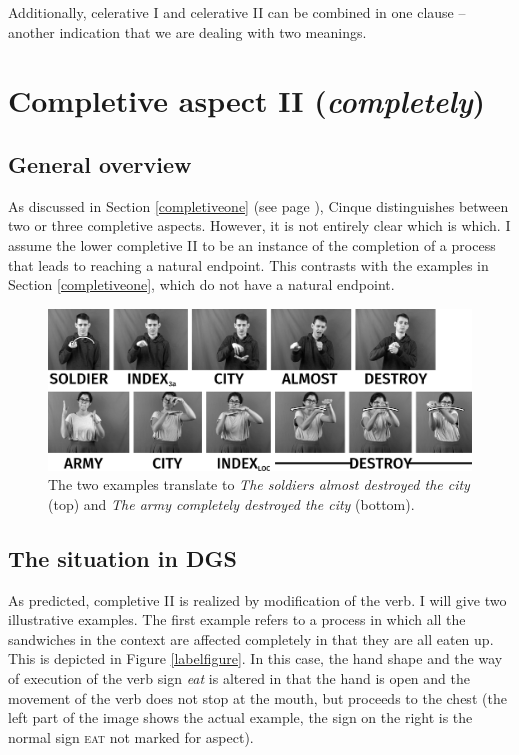 \noindent Additionally, celerative I and celerative II can be combined in one clause -- another indication that we are dealing with two meanings. 


\largerpage[-2]
\section{Completive aspect II (\textit{completely})}\label{completivetwo}
\subsection{General overview}
As discussed in Section \ref{completiveone} (see page \pageref{completiveone}), Cinque distinguishes between two or three completive aspects. However, it is not entirely clear which is which. I assume the lower completive II to be an instance of the completion of a process that leads to reaching a natural endpoint. This contrasts with the examples in Section \ref{completiveone}, which do not have a natural endpoint.


\begin{figure}[bt]
\centering
	\includegraphics[width=1.0\textwidth]{completivetwosw.jpg}
	\caption{The two examples translate to \textit{The soldiers almost destroyed the city} (top) and \textit{The army completely destroyed the city} (bottom).}
	\label{fig:completivetwodgsexampletwo}
\end{figure}


\subsection{The situation in DGS}
As predicted, completive II is realized by modification of the verb. I will give two illustrative examples. The first example refers to a process in which all the sandwiches in the context are affected completely in that they are all eaten up. This is depicted in Figure \ref{labelfigure}. In this case, the hand shape and the way of execution of the verb sign \textit{eat} is altered in that the hand is open and the movement of the verb does not stop at the mouth, but proceeds to the chest (the left part of the image shows the actual example, the sign on the right is the normal sign \textsc{eat} not marked for aspect).

